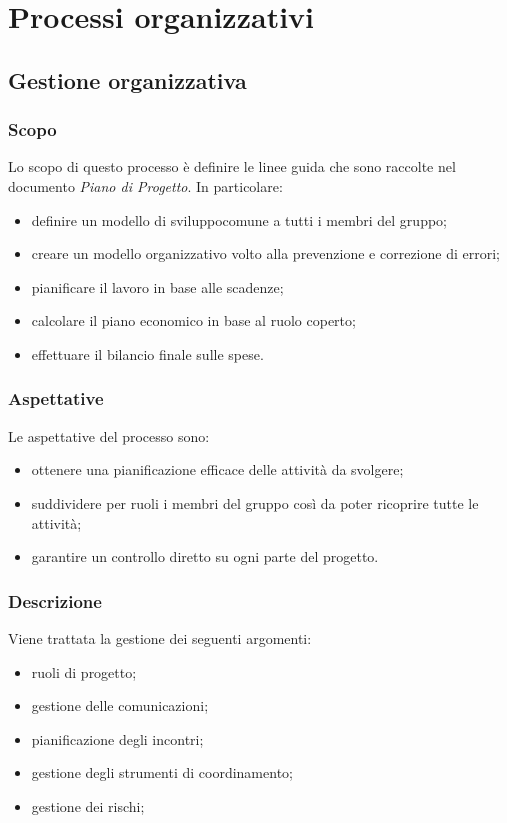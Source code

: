 \section{Processi organizzativi}
	\subsection{Gestione organizzativa}
		\subsubsection{Scopo}

		Lo scopo di questo processo è definire le linee guida che sono raccolte nel documento \textit{Piano di Progetto}. In particolare:
		\begin{itemize}
			\item definire un modello di sviluppo\glosp comune a tutti i membri del gruppo; 
			\item creare un modello organizzativo volto alla prevenzione e correzione di errori;
			\item pianificare il lavoro in base alle scadenze;
			\item calcolare il piano economico in base al ruolo coperto;
			\item effettuare il bilancio finale sulle spese.
		\end{itemize}

		\subsubsection{Aspettative}
		Le aspettative del processo sono:
		\begin{itemize}
			\item ottenere una pianificazione efficace delle attività da svolgere;
			\item suddividere per ruoli i membri del gruppo così da poter ricoprire tutte le attività;
			\item garantire un controllo diretto su ogni parte del progetto.
		\end{itemize}
		\subsubsection{Descrizione}
		Viene trattata la gestione dei seguenti argomenti:
		\begin{itemize}
			\item ruoli di progetto;
			\item gestione delle comunicazioni;
			\item pianificazione degli incontri;
			\item gestione degli strumenti di coordinamento;
			\item gestione dei rischi;
		\end{itemize}
